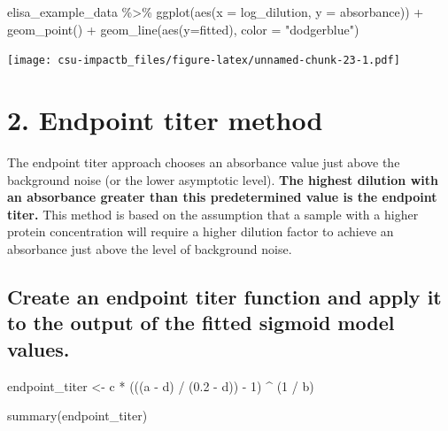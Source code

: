 \documentclass[
]{book}
\newenvironment{Shaded}{\begin{snugshade}}{\end{snugshade}}
\newcommand{\AttributeTok}[1]{\textcolor[rgb]{0.77,0.63,0.00}{#1}}
\newcommand{\DecValTok}[1]{\textcolor[rgb]{0.00,0.00,0.81}{#1}}
\newcommand{\FloatTok}[1]{\textcolor[rgb]{0.00,0.00,0.81}{#1}}
\newcommand{\FunctionTok}[1]{\textcolor[rgb]{0.00,0.00,0.00}{#1}}
\newcommand{\NormalTok}[1]{#1}
\newcommand{\OtherTok}[1]{\textcolor[rgb]{0.56,0.35,0.01}{#1}}
\newcommand{\SpecialCharTok}[1]{\textcolor[rgb]{0.00,0.00,0.00}{#1}}
\newcommand{\StringTok}[1]{\textcolor[rgb]{0.31,0.60,0.02}{#1}}
\begin{document}
\begin{Shaded}
\begin{Highlighting}[]
\NormalTok{elisa\_example\_data }\SpecialCharTok{\%\textgreater{}\%}
  \FunctionTok{ggplot}\NormalTok{(}\FunctionTok{aes}\NormalTok{(}\AttributeTok{x =}\NormalTok{ log\_dilution, }\AttributeTok{y =}\NormalTok{ absorbance)) }\SpecialCharTok{+}
  \FunctionTok{geom\_point}\NormalTok{() }\SpecialCharTok{+}
  \FunctionTok{geom\_line}\NormalTok{(}\FunctionTok{aes}\NormalTok{(}\AttributeTok{y=}\NormalTok{fitted), }\AttributeTok{color =} \StringTok{"dodgerblue"}\NormalTok{)}
\end{Highlighting}
\end{Shaded}

\texttt{[image: csu-impactb\_files/figure-latex/unnamed-chunk-23-1.pdf]}

\hypertarget{endpoint-titer-method}{%
\section{2. Endpoint titer method}\label{endpoint-titer-method}}

The endpoint titer approach chooses an absorbance value just above the background noise (or the lower asymptotic level). \textbf{The highest dilution with an absorbance greater than this predetermined value is the endpoint titer.} This method is based on the assumption that a sample with a higher protein concentration will require a higher dilution factor to achieve an absorbance just above the level of background noise.

\hypertarget{create-an-endpoint-titer-function-and-apply-it-to-the-output-of-the-fitted-sigmoid-model-values.}{%
\subsection{Create an endpoint titer function and apply it to the output of the fitted sigmoid model values.}\label{create-an-endpoint-titer-function-and-apply-it-to-the-output-of-the-fitted-sigmoid-model-values.}}

\begin{Shaded}
\begin{Highlighting}[]
\NormalTok{endpoint\_titer }\OtherTok{\textless{}{-}}\NormalTok{ c }\SpecialCharTok{*}\NormalTok{ (((a }\SpecialCharTok{{-}}\NormalTok{ d) }\SpecialCharTok{/}\NormalTok{ (}\FloatTok{0.2} \SpecialCharTok{{-}}\NormalTok{ d)) }\SpecialCharTok{{-}} \DecValTok{1}\NormalTok{) }\SpecialCharTok{\^{}}\NormalTok{ (}\DecValTok{1} \SpecialCharTok{/}\NormalTok{ b)}

\FunctionTok{summary}\NormalTok{(endpoint\_titer)}
\end{Highlighting}
\end{Shaded}
\end{document}

